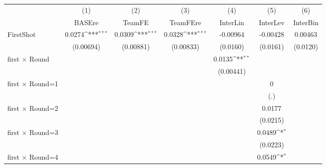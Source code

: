 {
\def\sym#1{\ifmmode^{#1}\else\(^{#1}\)\fi}
\begin{tabular}{l*{6}{c}}
\hline\hline
                    &\multicolumn{1}{c}{(1)}&\multicolumn{1}{c}{(2)}&\multicolumn{1}{c}{(3)}&\multicolumn{1}{c}{(4)}&\multicolumn{1}{c}{(5)}&\multicolumn{1}{c}{(6)}\\
                    &\multicolumn{1}{c}{BASEre}&\multicolumn{1}{c}{TeamFE}&\multicolumn{1}{c}{TeamFEre}&\multicolumn{1}{c}{InterLin}&\multicolumn{1}{c}{InterLev}&\multicolumn{1}{c}{InterBin}\\
\hline
FirstShot           &      0.0274\sym{***}&      0.0309\sym{***}&      0.0328\sym{***}&    -0.00964         &    -0.00428         &     0.00463         \\
                    &   (0.00694)         &   (0.00881)         &   (0.00833)         &    (0.0160)         &    (0.0161)         &    (0.0120)         \\
[1em]
first $\times$ Round&                     &                     &                     &      0.0135\sym{**} &                     &                     \\
                    &                     &                     &                     &   (0.00441)         &                     &                     \\
[1em]
first $\times$ Round=1&                     &                     &                     &                     &           0         &                     \\
                    &                     &                     &                     &                     &         (.)         &                     \\
[1em]
first $\times$ Round=2&                     &                     &                     &                     &      0.0177         &                     \\
                    &                     &                     &                     &                     &    (0.0215)         &                     \\
[1em]
first $\times$ Round=3&                     &                     &                     &                     &      0.0489\sym{*}  &                     \\
                    &                     &                     &                     &                     &    (0.0223)         &                     \\
[1em]
first $\times$ Round=4&                     &                     &                     &                     &      0.0549\sym{*}  &                     \\

\end{tabular}}
